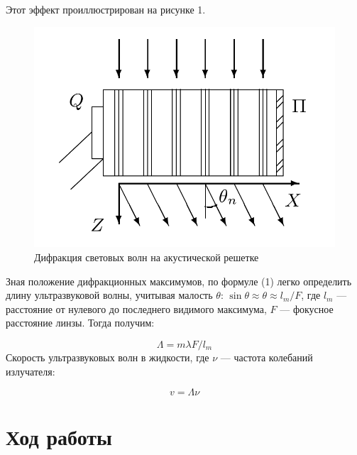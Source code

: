 \documentclass[a4paper, 12pt]{article}%
\begin{document}
	Этот эффект проиллюстрирован на рисунке 1.
	\begin{figure}[H]
	\centering	
	\includegraphics[width=0.3\linewidth]{difraction.png}
	\caption{Дифракция световых волн на акустической решетке}
	\label{fig:}
	\end{figure}
	
	Зная положение дифракционных максимумов, по формуле (1) легко определить длину ультразвуковой волны, учитывая малость $ \theta $: $ \sin \theta \approx \theta \approx l_m /F  $, где $ l_m $ --- расстояние от нулевого до последнего видимого максимума, $ F $ --- фокусное расстояние линзы. Тогда получим:
	
	\begin{equation}\label{}
	\Lambda = m \lambda F/ l_m 
	\end{equation}
	Скорость ультразвуковых волн в жидкости, где $ \nu $ --- частота колебаний излучателя:
	
	\begin{equation}\label{}
	v = \Lambda \nu 
	\end{equation}
	\section{Ход работы}
\end{document}
